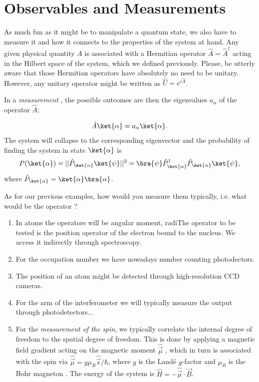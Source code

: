 \section{Observables and Measurements}
As much fun as it might be to manipulate a quantum state, we also have to measure it and how it connects to the properties of the system at hand. Any given physical quantity $A$ is associated with a Hermitian operator $\hat{A} = \hat{A}^\dag$ acting in the Hilbert space of the system, which we defined previously. Please, be utterly aware that those Hermitian operators have absolutely no need to be unitary. However, any unitary operator might be written as $\hat{U}= e^{i\hat{A}}$.

In a \emph{measurement} , the possible outcomes are then the eigenvalues $a_\alpha$  of the operator $\hat{A}$:

\begin{align}
	\hat{A}\ket{\alpha}=a_{\alpha}\ket{\alpha}.
\end{align}
The system will collapse to the corresponding eigenvector and the probability of finding the system in state $\ket{\alpha}$ is
\begin{align}
	P(\ket{\alpha})=||\hat{P}_{\ket{\alpha}} \ket{\psi}||^2 = \bra{\psi} \hat{P}^{\dag}_{\ket{\alpha}} \hat{P}_{\ket{\alpha}} \ket{\psi},
\end{align}
where $\hat{P}_{\ket{\alpha}}= \ket{\alpha} \bra{\alpha}$.

As for our previous examples, how would you measure them typically, i.e. what would be the operator ?
\begin{enumerate}
\item In atoms the operators will be angular moment, radiThe operator to be tested is the position operator of the electron bound to the nucleus. We access it indirectly through spectroscopy.
\item For the occupation number we have nowadays number counting photodectors.
\item The position of an atom might be detected through high-resolution CCD cameras.
\item For the arm of the interferometer we will typically measure the output through photodetectors...
\item For the \textit{measurement of the spin}, we typically correlate the internal degree of freedom to the spatial degree of freedom. This is done by applying a magnetic field gradient acting on the magnetic moment $\hat{\vec{\mu}}$ , which in turn is associated with the spin via $\hat{\vec{\mu}} = g \mu_B \hat{\vec{s}}/\hbar$, where $g$ is the Landé $g$-factor  and $\mu_B$ is the Bohr magneton . The energy of the system is $\hat{H} = -\hat{\vec{\mu}} \cdot \vec{B}$.
\end{enumerate}